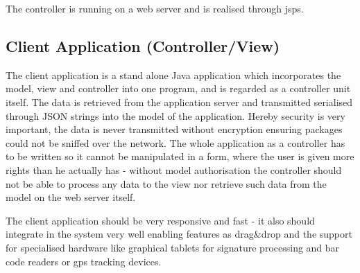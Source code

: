\documentclass[11pt,a4paper,oneside,svgnames]{report}
\begin{document}
The controller is running on a web server and is realised through \glspl{jsp}.

\subsection{Client Application (Controller/View)}
The client application is a stand alone Java application which incorporates the model, view and controller into one program, and is regarded as a controller unit itself. The data is retrieved from the application server and transmitted serialised through JSON strings into the model of the application. Hereby security is very important, the data is never transmitted without encryption ensuring packages could not be sniffed over the network. The whole application as a controller has to be written so it cannot be manipulated in a form, where the user is given more rights than he actually has - without model authorisation the controller should not be able to process any data to the view nor retrieve such data from the model on the web server itself.

The client application should be very responsive and fast - it also should integrate in the system very well enabling features as drag\&drop and the support for specialised hardware like graphical tablets for signature processing and bar code readers or gps tracking devices.
\end{document}
